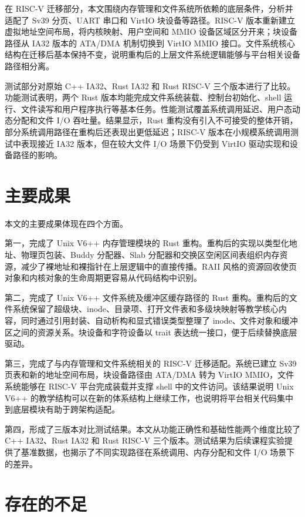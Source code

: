 在 RISC-V 迁移部分，本文围绕内存管理和文件系统所依赖的底层条件，分析并适配了 Sv39 分页、UART 串口和 VirtIO 块设备等路径。RISC-V 版本重新建立虚拟地址空间布局，将内核映射、用户空间和 MMIO 设备区域区分开来；块设备路径从 IA32 版本的 ATA/DMA 机制切换到 VirtIO MMIO 接口。文件系统核心结构在迁移后基本保持不变，说明重构后的上层文件系统逻辑能够与平台相关设备路径相分离。

测试部分对原始 C++ IA32、Rust IA32 和 Rust RISC-V 三个版本进行了比较。功能测试表明，两个 Rust 版本均能完成文件系统装载、控制台初始化、shell 运行、文件读写和用户程序执行等基本任务。性能测试覆盖系统调用延迟、用户态动态分配和文件 I/O 吞吐量。结果显示，Rust 重构没有引入不可接受的整体开销，部分系统调用路径在重构后还表现出更低延迟；RISC-V 版本在小规模系统调用测试中表现接近 IA32 版本，但在较大文件 I/O 场景下仍受到 VirtIO 驱动实现和设备路径的影响。

\section{主要成果}

本文的主要成果体现在四个方面。

第一，完成了 Unix V6++ 内存管理模块的 Rust 重构。重构后的实现以类型化地址、物理页包装、Buddy 分配器、Slab 分配器和交换区空闲区间表组织内存资源，减少了裸地址和裸指针在上层逻辑中的直接传播。RAII 风格的资源回收使页对象和内核对象的生命周期更容易从代码结构中识别。

第二，完成了 Unix V6++ 文件系统及缓冲区缓存路径的 Rust 重构。重构后的文件系统保留了超级块、inode、目录项、打开文件表和多级块映射等教学核心内容，同时通过引用封装、自动析构和显式错误类型整理了 inode、文件对象和缓冲区之间的资源关系。块设备和字符设备以 trait 表达统一接口，便于后续替换底层驱动。

第三，完成了与内存管理和文件系统相关的 RISC-V 迁移适配。系统已建立 Sv39 页表和新的地址空间布局，块设备路径由 ATA/DMA 转为 VirtIO MMIO，文件系统能够在 RISC-V 平台完成装载并支撑 shell 中的文件访问。该结果说明 Unix V6++ 的教学结构可以在新的体系结构上继续工作，也说明将平台相关代码集中到底层模块有助于跨架构适配。

第四，形成了三版本对比测试结果。本文从功能正确性和基础性能两个维度比较了 C++ IA32、Rust IA32 和 Rust RISC-V 三个版本。测试结果为后续课程实验提供了基准数据，也揭示了不同实现路径在系统调用、内存分配和文件 I/O 场景下的差异。

\section{存在的不足}

